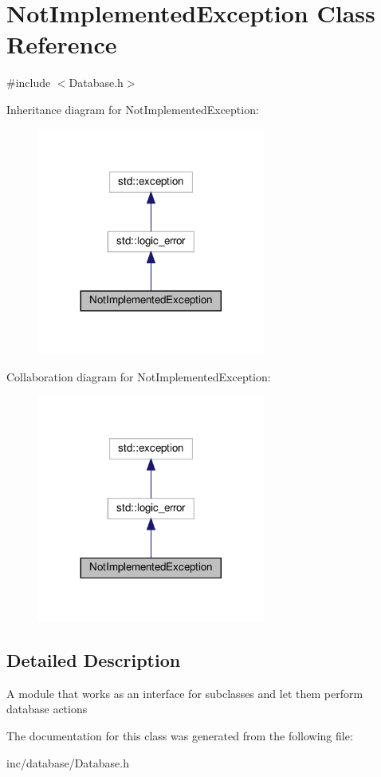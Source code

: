 \hypertarget{classNotImplementedException}{}\section{Not\+Implemented\+Exception Class Reference}
\label{classNotImplementedException}


 




{\ttfamily \#include $<$Database.\+h$>$}



Inheritance diagram for Not\+Implemented\+Exception\+:\nopagebreak
\begin{figure}[H]
\begin{center}
\leavevmode
\includegraphics[width=212pt]{classNotImplementedException__inherit__graph}
\end{center}
\end{figure}


Collaboration diagram for Not\+Implemented\+Exception\+:\nopagebreak
\begin{figure}[H]
\begin{center}
\leavevmode
\includegraphics[width=212pt]{classNotImplementedException__coll__graph}
\end{center}
\end{figure}


\subsection{Detailed Description}


A module that works as an interface for subclasses and let them perform database actions 

The documentation for this class was generated from the following file\+:\begin{DoxyCompactItemize}
\item 
inc/database/Database.\+h\end{DoxyCompactItemize}
